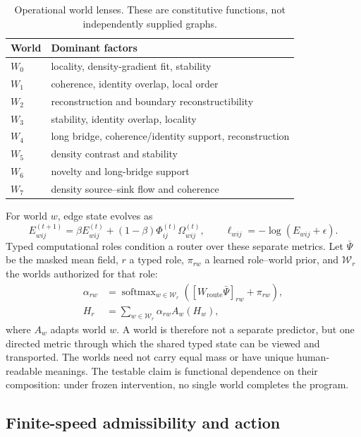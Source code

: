 \documentclass[11pt]{article}
\begin{document}
\begin{table}[t]
\centering
\caption{Operational world lenses. These are constitutive functions, not
independently supplied graphs.}
\label{tab:worlds}
\small
\begin{tabularx}{\linewidth}{@{}lY@{}}
\toprule
World & Dominant factors \\
\midrule
$W_0$ & locality, density-gradient fit, stability \\
$W_1$ & coherence, identity overlap, local order \\
$W_2$ & reconstruction and boundary reconstructibility \\
$W_3$ & stability, identity overlap, locality \\
$W_4$ & long bridge, coherence/identity support, reconstruction \\
$W_5$ & density contrast and stability \\
$W_6$ & novelty and long-bridge support \\
$W_7$ & density source--sink flow and coherence \\
\bottomrule
\end{tabularx}
\end{table}

For world $w$, edge state evolves as
\begin{equation}
E_{wij}^{(t+1)}=\beta E_{wij}^{(t)}+
 (1-\beta)\Phi_{ij}^{(t)}\Omega_{wij}^{(t)},
\qquad
\ell_{wij}=-\log(E_{wij}+\epsilon).
\label{eq:edge}
\end{equation}
Typed computational roles condition a router over these separate metrics. Let
$\bar\Psi$ be the masked mean field, $r$ a typed role, $\pi_{rw}$ a learned
role--world prior, and $\mathcal{W}_r$ the worlds authorized for that role:
\begin{align}
\alpha_{rw} &= \operatorname{softmax}_{w\in\mathcal{W}_r}
   \left([W_{\mathrm{route}}\bar\Psi]_{rw}+\pi_{rw}\right), \\
H_r &= \sum_{w\in\mathcal{W}_r}\alpha_{rw}A_w(H_w),
\label{eq:router}
\end{align}
where $A_w$ adapts world $w$. A world is therefore not a separate predictor,
but one directed metric through which the shared typed state can be viewed and
transported. The worlds need not carry equal mass or have unique
human-readable meanings. The testable claim is functional dependence on their
composition: under frozen intervention, no single world completes the program.

\subsection{Finite-speed admissibility and action}
\end{document}
